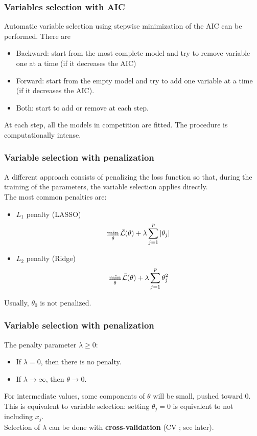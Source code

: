 \begin{frame}
\frametitle{Variables selection with AIC}
Automatic variable selection using stepwise minimization of the AIC can be performed. There are 
\begin{itemize}
\item Backward: start from the most complete model and try to remove variable one at a time (if it decreases the AIC)
\item Forward: start from the empty model and try to add one variable at a time (if it decreases the AIC).
\item Both: start to add or remove at each step.
\end{itemize}
At each step, all the models in competition are fitted. The procedure is computationally intense.
\end{frame}
\begin{frame}
\frametitle{Variable selection with penalization}
A different approach consists of penalizing the loss function so that, during the training of the parameters, the variable selection applies directly.\\
\vspace{0.3cm}
The most common penalties are:
\begin{itemize}
\item $L_1$ penalty (LASSO)
$$
\min_\theta \bar{\cal L}(\theta) + \lambda \sum_{j=1}^p \vert \theta_j \vert
$$
\item $L_2$ penalty (Ridge)
$$
\displaystyle \min_\theta \bar{\cal L}(\theta) + \lambda \sum_{j=1}^p \theta_j^2
$$
\end{itemize} 
Usually, $\theta_0$ is not penalized. 
\end{frame}
\begin{frame}
\frametitle{Variable selection with penalization}
The penalty parameter $\lambda \geq 0$:
\begin{itemize}
\item If $\lambda =0$, then there is no penalty.
\item If $\lambda \longrightarrow \infty$, then $\theta \longrightarrow 0$.
\end{itemize}
For intermediate values, some components of $\theta$ will be small, pushed toward $0$.\\ \vspace{0.3cm}
This is equivalent to variable selection: setting $\theta_j=0$ is equivalent to not including $x_j$.\\
\vspace{0.3cm}
Selection of $\lambda$ can be done with {\bf cross-validation} (CV ; see later).
\end{frame}

